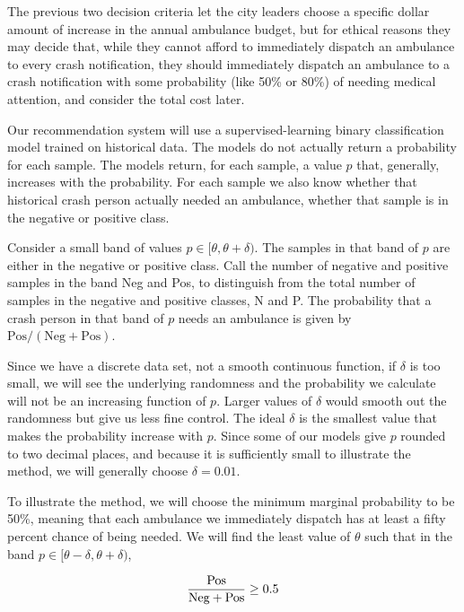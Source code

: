 The previous two decision criteria let the city leaders choose a specific dollar amount of increase in the annual ambulance budget, but for ethical reasons they may decide that, while they cannot afford to immediately dispatch an ambulance to every crash notification, they should immediately dispatch an ambulance to a crash notification with some probability (like 50\% or 80\%) of needing medical attention, and consider the total cost later.  

Our recommendation system will use a supervised-learning binary classification model trained on historical data. The models do not actually return a probability for each sample.  The models return, for each sample, a value $p$ that, generally, increases with the probability.  For each sample we also know whether that historical crash person actually needed an ambulance, whether that sample is in the negative or positive class.  

Consider a small band of values $p \in [\theta, \theta + \delta)$.  The samples in that band of $p$ are either in the negative or positive class.  Call the number of negative and positive samples in the band Neg and Pos, to distinguish from the total number of samples in the negative and positive classes, N and P.  The probability that a crash person in that band of $p$ needs an ambulance is given by 
$\text{Pos}/(\text{Neg} + \text{Pos})$.  

Since we have a discrete data set, not a smooth continuous function, if $\delta$ is too small, we will see the underlying randomness and the probability we calculate will not be an increasing function of $p$.  Larger values of $\delta$ would smooth out the randomness but give us less fine control.  The ideal $\delta$ is the smallest value that makes the probability increase with $p$.   Since some of our models give $p$ rounded to two decimal places, and because it is sufficiently small to illustrate the method, we will generally choose $\delta = 0.01$.  

To illustrate the method, we will choose the minimum marginal probability to be 50\%, meaning that each ambulance we immediately dispatch has at least a fifty percent chance of being needed.  We will find the least value of $\theta$ such that in the band $p \in [\theta - \delta, \theta + \delta)$, 

\begin{equation} \label{eq:budget_3}\hfil
\frac{\text{Pos}}{\text{Neg}+\text{Pos}} \ge 0.5
\end{equation}

